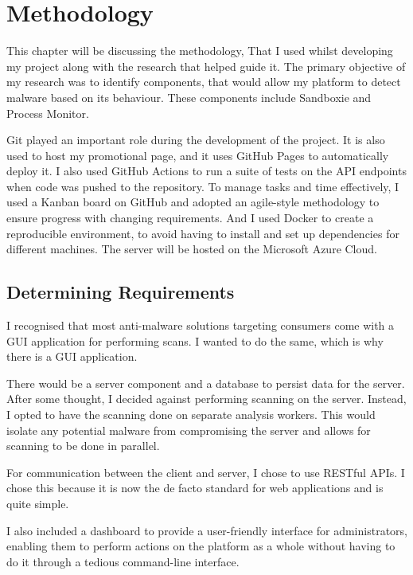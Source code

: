 \chapter{Methodology}

This chapter will be discussing the methodology,
That I used whilst developing my project
along with the research that helped guide it.
The primary objective of my research was to identify components,
that would allow my platform to detect malware based on its behaviour.
These components include Sandboxie and Process Monitor.

Git played an important role during the development of the project.
It is also used to host my promotional page,
and it uses GitHub Pages to automatically deploy it.
I also used GitHub Actions to run a suite of tests on the
API endpoints when code was pushed to the repository.
To manage tasks and time effectively, I used a Kanban board on GitHub
and adopted an agile-style methodology to ensure
progress with changing requirements.
And I used Docker to create a reproducible environment,
to avoid having to install and set up dependencies for different machines.
The server will be hosted on the Microsoft Azure Cloud.

\section{Determining Requirements}
I recognised that most anti-malware solutions targeting consumers
come with a GUI application for performing scans.
I wanted to do the same, which is why there is a GUI application.

There would be a server component and a database to persist data for the server.
After some thought, I decided against performing scanning on the server.
Instead, I opted to have the scanning done on separate analysis workers.
This would isolate any potential malware from compromising the server and
allows for scanning to be done in parallel.

For communication between the client and server, I chose to use RESTful APIs.
I chose this because it is now the de facto standard for web applications and is quite simple.

I also included a dashboard to provide a user-friendly interface for administrators,
enabling them to perform actions on the platform as a whole without
having to do it through a tedious command-line interface.

